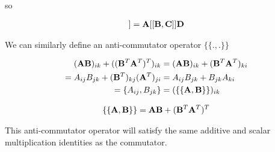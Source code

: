 \documentclass[12pt]{article}
\newcommand{\bv}[1]{\bold{#1}}
\begin{document}
so

\begin{align}
[[\bv{A}\bv{B},\bv{C}\bv{D}]] = \bv{A}[[\bv{B},\bv{C}]]\bv{D}
\end{align}

We can similarly define an anti-commutator operator $\{\{.,.\}\}$

\begin{align}
(\bv{A}\bv{B})_{ik} + ((\bv{B}^T\bv{A}^T)^T)_{ik} &= (\bv{A}\bv{B})_{ik} + (\bv{B}^T\bv{A}^T)_{ki}\\
= A_{ij} B_{jk} + (\bv{B}^T)_{kj}(\bv{A}^T)_{ji} &= A_{ij}B_{jk} + B_{jk} A_{ki}\\
= \{A_{ij},B_{jk}\} &= (\{\{\bv{A},\bv{B}\}\})_{ik}
\end{align}

\begin{align}
\{\{\bv{A},\bv{B}\}\} = \bv{A}\bv{B} + (\bv{B}^T\bv{A}^T)^T
\end{align}

This anti-commutator operator will satisfy the same additive and scalar multiplication identities as the commutator.
\end{document}
